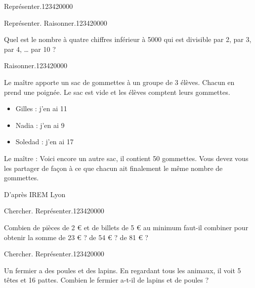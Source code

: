 \begin{pageParcourst}

\begin{ExoCt}{Représenter.}{1234}{2}{0}{0}{0}{0}

 

\end{ExoCt}

\begin{ExoCt}{Représenter. Raisonner.}{1234}{2}{0}{0}{0}{0}
 
 Quel est le nombre à quatre chiffres inférieur à 5000 qui est divisible par 2, par 3, par 4, … par 10 ? 


\end{ExoCt}


\begin{ExoCt}{Raisonner.}{1234}{2}{0}{0}{0}{0}
 
Le maître apporte un sac de gommettes à un groupe de 3 élèves. Chacun en prend une poignée. Le sac est vide et les élèves comptent leurs gommettes.
\begin{itemize}
\item Gilles : j’en ai 11
\item Nadia : j’en ai 9
\item Soledad : j’en ai 17
\end{itemize}
Le maître : Voici encore un autre sac, il contient 50 gommettes. 
Vous devez vous les partager de façon à ce que chacun ait finalement le même nombre de gommettes. 
 
 
\hfill{\tiny D'après IREM Lyon} 
\end{ExoCt}

\begin{ExoCt}{Chercher. Représenter.}{1234}{2}{0}{0}{0}{0}

Combien de pièces de 2 € et de billets de 5 € au minimum faut-il combiner pour obtenir la somme de 23 € ? de 54 € ? de 81 € ?

\end{ExoCt}

\begin{ExoCt}{Chercher. Représenter.}{1234}{2}{0}{0}{0}{0}

Un fermier a des poules et des lapins. En regardant tous les animaux, il voit 5 têtes et 16 pattes. Combien le fermier a-t-il de lapins et de poules ?

\end{ExoCt}

 

\end{pageParcourst}

